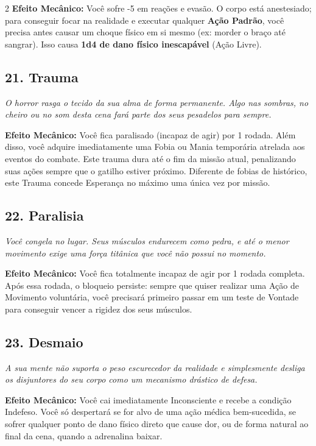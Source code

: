 \documentclass[a4paper,11pt,openany]{book}
\begin{document}
\begin{multicols}{2}
\textbf{Efeito Mecânico:} Você sofre -5 em reações e evasão. O corpo está anestesiado; para conseguir focar na realidade e executar qualquer \textbf{Ação Padrão}, você precisa antes causar um choque físico em si mesmo (ex: morder o braço até sangrar). Isso causa \textbf{1d4 de dano físico inescapável} (Ação Livre).

\subsection*{21. Trauma}
\textit{O horror rasga o tecido da sua alma de forma permanente. Algo nas sombras, no cheiro ou no som desta cena fará parte dos seus pesadelos para sempre.}

\textbf{Efeito Mecânico:} Você fica paralisado (incapaz de agir) por 1 rodada. Além disso, você adquire imediatamente uma Fobia ou Mania temporária atrelada aos eventos do combate. Este trauma dura até o fim da missão atual, penalizando suas ações sempre que o gatilho estiver próximo. Diferente de fobias de histórico, este Trauma concede Esperança no máximo uma única vez por missão.


\subsection*{22. Paralisia}
\textit{Você congela no lugar. Seus músculos endurecem como pedra, e até o menor movimento exige uma força titânica que você não possui no momento.}

\textbf{Efeito Mecânico:} Você fica totalmente incapaz de agir por 1 rodada completa. Após essa rodada, o bloqueio persiste: sempre que quiser realizar uma Ação de Movimento voluntária, você precisará primeiro passar em um teste de Vontade para conseguir vencer a rigidez dos seus músculos.



\subsection*{23. Desmaio}
\textit{A sua mente não suporta o peso escurecedor da realidade e simplesmente desliga os disjuntores do seu corpo como um mecanismo drástico de defesa.}

\textbf{Efeito Mecânico:} Você cai imediatamente Inconsciente e recebe a condição Indefeso. Você só despertará se for alvo de uma ação médica bem-sucedida, se sofrer qualquer ponto de dano físico direto que cause dor, ou de forma natural ao final da cena, quando a adrenalina baixar.


\end{multicols}
\end{document}
